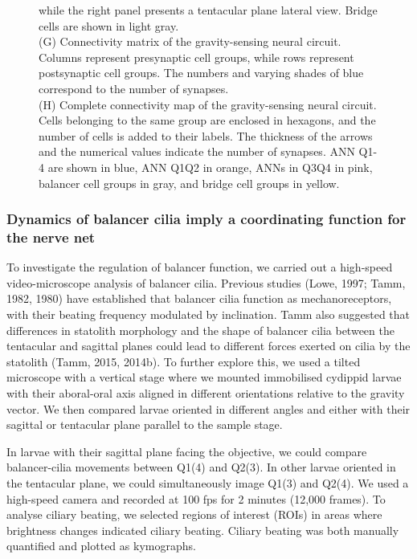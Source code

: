 \documentclass[
  11pt,
]{article}
\begin{document}
\begin{figure}[H]
{while the right panel presents a tentacular plane lateral view. Bridge
cells are shown in light gray.\\
(G) Connectivity matrix of the gravity-sensing neural circuit. Columns
represent presynaptic cell groups, while rows represent postsynaptic
cell groups. The numbers and varying shades of blue correspond to the
number of synapses.\\
(H) Complete connectivity map of the gravity-sensing neural circuit.
Cells belonging to the same group are enclosed in hexagons, and the
number of cells is added to their labels. The thickness of the arrows
and the numerical values indicate the number of synapses. ANN Q1-4 are
shown in blue, ANN Q1Q2 in orange, ANNs in Q3Q4 in pink, balancer cell
groups in gray, and bridge cell groups in yellow.}

\end{figure}%

\subsubsection{Dynamics of balancer cilia imply a coordinating function
for the nerve
net}\label{dynamics-of-balancer-cilia-imply-a-coordinating-function-for-the-nerve-net}

To investigate the regulation of balancer function, we carried out a
high-speed video-microscope analysis of balancer cilia. Previous studies
(Lowe, 1997; Tamm, 1982, 1980) have established that balancer cilia
function as mechanoreceptors, with their beating frequency modulated by
inclination. Tamm also suggested that differences in statolith
morphology and the shape of balancer cilia between the tentacular and
sagittal planes could lead to different forces exerted on cilia by the
statolith (Tamm, 2015, 2014b). To further explore this, we used a tilted
microscope with a vertical stage where we mounted immobilised cydippid
larvae with their aboral-oral axis aligned in different orientations
relative to the gravity vector. We then compared larvae oriented in
different angles and either with their sagittal or tentacular plane
parallel to the sample stage.

In larvae with their sagittal plane facing the objective, we could
compare balancer-cilia movements between Q1(4) and Q2(3). In other
larvae oriented in the tentacular plane, we could simultaneously image
Q1(3) and Q2(4). We used a high-speed camera and recorded at 100 fps for
2 minutes (12,000 frames). To analyse ciliary beating, we selected
regions of interest (ROIs) in areas where brightness changes indicated
ciliary beating. Ciliary beating was both manually quantified and
plotted as kymographs.
\end{document}
